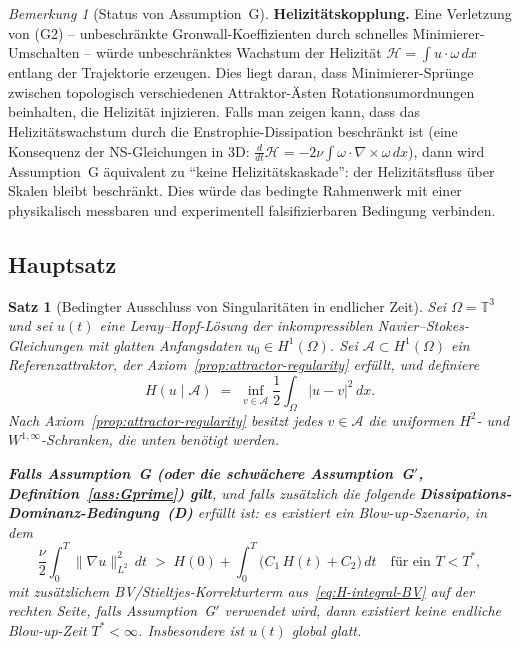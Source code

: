 \documentclass[12pt,a4paper]{article}
\theoremstyle{definition}
\theoremstyle{plain}
\newtheorem{theorem}[definition]{Satz}
\theoremstyle{remark}
\newtheorem{remark}[definition]{Bemerkung}
\begin{document}
\begin{remark}[Status von Assumption~G]
\medskip\noindent
\textbf{Helizitätskopplung.}\;
Eine Verletzung von (G2) -- unbeschränkte Gronwall-Koeffizienten durch
schnelles Minimierer-Umschalten -- würde unbeschränktes Wachstum der
Helizität $\mathcal{H} = \int u \cdot \omega\,dx$ entlang der Trajektorie erzeugen.
Dies liegt daran, dass Minimierer-Sprünge zwischen topologisch verschiedenen
Attraktor-Ästen Rotationsumordnungen beinhalten, die
Helizität injizieren. Falls man zeigen kann, dass das Helizitätswachstum durch die
Enstrophie-Dissipation beschränkt ist (eine Konsequenz der NS-Gleichungen in 3D:
$\frac{d}{dt}\mathcal{H} = -2\nu\int\omega\cdot\nabla\times\omega\,dx$),
dann wird Assumption~G äquivalent zu ``keine Helizitätskaskade'':
der Helizitätsfluss über Skalen bleibt beschränkt. Dies würde das
bedingte Rahmenwerk mit einer physikalisch messbaren und
experimentell falsifizierbaren Bedingung verbinden.
\end{remark}

\subsection*{Hauptsatz}
\begin{theorem}[Bedingter Ausschluss von Singularitäten in endlicher Zeit]
\label{thm:main}
Sei $\Omega = \mathbb{T}^3$ und sei $u(t)$ eine Leray--Hopf-Lösung der
inkompressiblen Navier--Stokes-Gleichungen mit glatten Anfangsdaten
$u_0 \in H^1(\Omega)$. Sei $\mathcal{A} \subset H^1(\Omega)$ ein
Referenzattraktor, der Axiom~\ref{prop:attractor-regularity} erfüllt, und definiere
\[
    H\!\left(u\mid\mathcal{A}\right)
    \;=\; \inf_{v\in\mathcal{A}}\frac{1}{2}\int_\Omega |u-v|^2\,dx.
\]
Nach Axiom~\ref{prop:attractor-regularity} besitzt jedes $v \in \mathcal{A}$
die uniformen $H^2$- und $W^{1,\infty}$-Schranken, die unten benötigt werden.

\textbf{Falls Assumption~G \textup{(}oder die schwächere
Assumption~G$'$, Definition~\ref{ass:Gprime}\textup{)} gilt},
und falls zusätzlich die folgende \textbf{Dissipations-Dominanz-Bedingung~(D)} erfüllt ist: es existiert ein Blow-up-Szenario, in dem
\begingroup
\renewcommand{\theequation}{D}
\renewcommand{\theHequation}{D}
\begin{equation}\label{eq:diss-dom}
  \frac{\nu}{2}\int_0^T \|\nabla u\|_{L^2}^2\,dt
  \;>\;
  H(0)+
  \int_0^T \bigl(C_1\,H(t) + C_2\bigr)\,dt
  \quad \text{für ein } T < T^*,
\end{equation}
\endgroup
mit zusätzlichem BV/Stieltjes-Korrekturterm aus~\eqref{eq:H-integral-BV}
auf der rechten Seite, falls Assumption~G$'$ verwendet wird,
dann existiert keine endliche Blow-up-Zeit $T^* < \infty$. Insbesondere ist
$u(t)$ global glatt.
\end{theorem}
\end{document}
